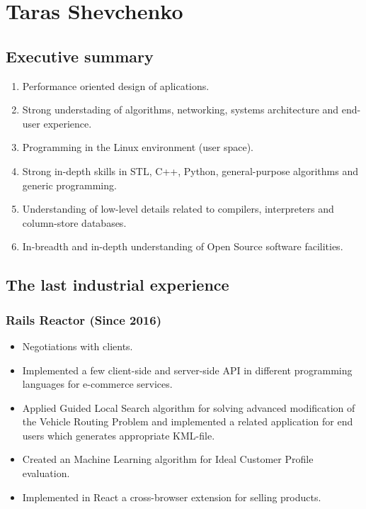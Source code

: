 \documentclass[a4paper,12pt,final]{extreport}
\begin{document}
\section{Taras Shevchenko}
\subsection{Executive summary}
\begin{enumerate}
  \item Performance oriented design of aplications.
  \item Strong understading of algorithms, networking, systems architecture and end-user experience.
  \item Programming in the Linux environment (user space).
  \item Strong in-depth skills in STL, C++, Python, general-purpose algorithms and generic programming.
  \item Understanding of low-level details related to compilers, interpreters and column-store databases.
  \item In-breadth and in-depth understanding of Open Source software facilities.
\end{enumerate}

\subsection{The last industrial experience}
\subsubsection{Rails Reactor (Since 2016)}
\begin{itemize}
  \item Negotiations with clients.
  \item Implemented a few client-side and server-side API in different programming languages for e-commerce services.
  \item Applied Guided Local Search algorithm for solving advanced modification
        of the Vehicle Routing Problem and implemented a related application
        for end users which generates appropriate KML-file.
  \item Created an Machine Learning algorithm for Ideal Customer Profile evaluation.
  \item Implemented in React a cross-browser extension for selling products.
\end{itemize}
\end{document}
